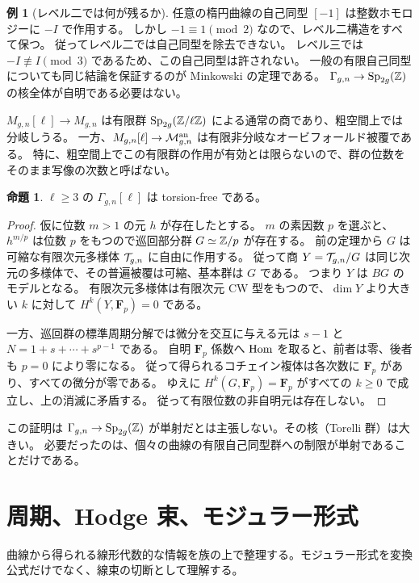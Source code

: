 \documentclass[dvipdfmx,a4paper,11pt]{article}
\theoremstyle{definition}
\newtheorem{prop}[thm]{命題}
\newtheorem{exa}[thm]{例}
\newenvironment{aim}{\begin{tcolorbox}[mybox,colback=green!3,title=この章で考えること,fonttitle=\bfseries]}{\end{tcolorbox}}
\DeclareMathOperator{\Sp}{Sp}\DeclareMathOperator{\Sym}{Sym}\DeclareMathOperator{\Ext}{Ext}
\begin{document}
\begin{exa}[レベル二では何が残るか]
任意の楕円曲線の自己同型 $[-1]$ は整数ホモロジーに $-I$ で作用する。
しかし $-1\equiv1\pmod2$ なので、レベル二構造をすべて保つ。
従ってレベル二では自己同型を除去できない。
レベル三では $-I\not\equiv I\pmod3$ であるため、この自己同型は許されない。
一般の有限自己同型についても同じ結論を保証するのが Minkowski の定理である。
$\Gamma_{g,n}\to\Sp_{2g}(\Z)$ の核全体が自明である必要はない。
\end{exa}

$M_{g,n}[\ell]\to M_{g,n}$ は有限群 $\Sp_{2g}(\Z/\ell\Z)$ による通常の商であり、粗空間上では分岐しうる。
一方、$M_{g,n}[\ell]\to\mathcal M_{g,n}^{\rm an}$ は有限非分岐なオービフォールド被覆である。
特に、粗空間上でこの有限群の作用が有効とは限らないので、群の位数をそのまま写像の次数と呼ばない。

\begin{prop}
$\ell\ge3$ の $\Gamma_{g,n}[\ell]$ は torsion-free である。
\end{prop}
\begin{proof}
仮に位数 $m>1$ の元 $h$ が存在したとする。
$m$ の素因数 $p$ を選ぶと、$h^{m/p}$ は位数 $p$ をもつので巡回部分群 $G\simeq\mathbb Z/p$ が存在する。
前の定理から $G$ は可縮な有限次元多様体 $\mathcal T_{g,n}$ に自由に作用する。
従って商 $Y=\mathcal T_{g,n}/G$ は同じ次元の多様体で、その普遍被覆は可縮、基本群は $G$ である。
つまり $Y$ は $BG$ のモデルとなる。
有限次元多様体は有限次元 CW 型をもつので、$\dim Y$ より大きい $k$ に対して $H^k(Y,\mathbf F_p)=0$ である。

一方、巡回群の標準周期分解では微分を交互に与える元は $s-1$ と $N=1+s+\cdots+s^{p-1}$ である。
自明 $\mathbf F_p$ 係数へ $\operatorname{Hom}$ を取ると、前者は零、後者も $p=0$ により零になる。
従って得られるコチェイン複体は各次数に $\mathbf F_p$ があり、すべての微分が零である。
ゆえに $H^k(G,\mathbf F_p)=\mathbf F_p$ がすべての $k\ge0$ で成立し、上の消滅に矛盾する。
従って有限位数の非自明元は存在しない。
\end{proof}
この証明は $\Gamma_{g,n}\to\Sp_{2g}(\Z)$ が単射だとは主張しない。その核（Torelli 群）は大きい。
必要だったのは、個々の曲線の有限自己同型群への制限が単射であることだけである。

\par\bigskip\Needspace{.70\textheight}
\section{周期、Hodge 束、モジュラー形式}\label{sec:period}
\begin{aim}
曲線から得られる線形代数的な情報を族の上で整理する。モジュラー形式を変換公式だけでなく、線束の切断として理解する。
\end{aim}
\end{document}

